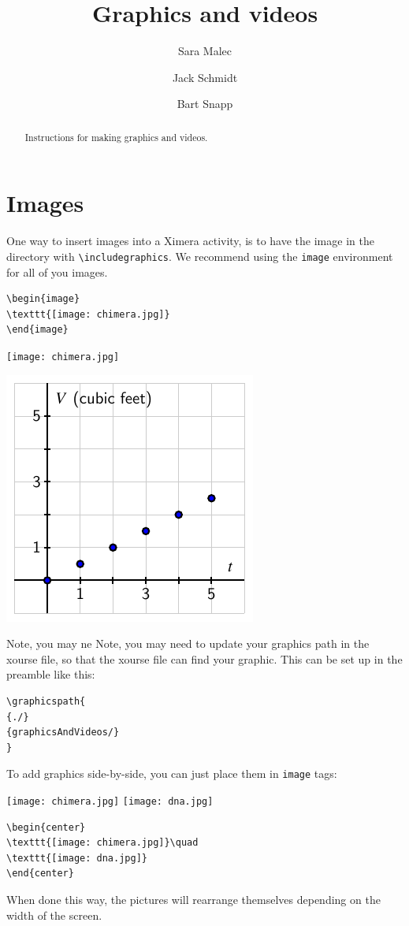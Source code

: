 \documentclass{ximera}
\title{Graphics and videos}
\author{Sara Malec \and Jack Schmidt \and Bart Snapp}
\begin{document}
\begin{abstract}
Instructions for making graphics and videos.
\end{abstract}
\maketitle

\section{Images}
One way to insert images into a Ximera activity, is to have the image
in the directory with \verb|\includegraphics|.  We recommend using the
\verb|image| environment for all of you images.
\begin{verbatim}
\begin{image}
\texttt{[image: chimera.jpg]}
\end{image}
\end{verbatim}
\begin{image}
\texttt{[image: chimera.jpg]}
\end{image}


\begin{image}
\includegraphics{aquarium.pdf}
\end{image}
Note, you may ne
Note, you may need to update your graphics path in the xourse file, so
that the xourse file can find your graphic. This can be set up in the
preamble like this:
\begin{verbatim}
\graphicspath{
{./}
{graphicsAndVideos/}
}
\end{verbatim}

To add graphics side-by-side, you can just place them in \verb|image| tags:

\begin{center}
  \texttt{[image: chimera.jpg]}\quad
  \texttt{[image: dna.jpg]}
\end{center}
\begin{verbatim}
\begin{center}
\texttt{[image: chimera.jpg]}\quad
\texttt{[image: dna.jpg]}
\end{center}
\end{verbatim}
When done this way, the pictures will rearrange themselves depending on the width of the screen.
\end{document}
